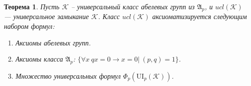 \documentclass[a4paper,11pt,twoside]{article}
\newtheorem{theorem}{Теорема}[section]
\def\A{{\mathfrak{A}}}
\def\K{{\mathcal{K}}}
\def\N{{\mathbb{N}}}
\def\ui{{\mathrm{UI}}}
\begin{document}
\begin{theorem}
Пусть $\K$ -- универсальный класс абелевых групп из $\A_p$, и $ucl(\K)$ --- универсальное замыкание $\K$. Класс $ucl(\K)$ аксиоматизируется следующим набором формул:
\begin{enumerate}
\item Аксиомы абелевых групп.
\item Аксиомы класса $\A_p$: $\{ \forall x \ qx = 0 \rightarrow x = 0 | \ (p,q) = 1 \}$.
\item Множество универсальных формул $\Phi_p(\ui_p(\K))$.


\end{enumerate}
\end{theorem}
\end{document}
